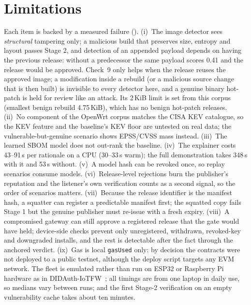 \documentclass[conference]{IEEEtran}
\newcommand{\res}[1]{{\small\path{#1}}}  %
\begin{document}
\section{Limitations}
\label{sec:limits}
Each item is backed by a measured failure (\res{docs/limitations.md}).
(i)~The image detector sees \emph{structural} tampering only; a malicious build that preserves
size, entropy and layout passes Stage 2, and detection of an appended payload depends on having
the previous release: without a predecessor the same payload scores 0.41 and the release would be
approved. Check~9 only helps when the release reuses the approved image; a modification inside a
rebuild (or a malicious source change that is then built) is invisible to every detector here,
and a genuine binary hot-patch is held for review like an attack. Its 2\,KiB limit is set from
this corpus (smallest benign rebuild 4.75\,KiB), which has no benign hot-patch releases. (ii)~No component of the OpenWrt corpus matches the CISA KEV catalogue, so the KEV
feature and the baseline's KEV floor are untested on real data; the vulnerable-but-genuine
scenario shows EPSS/CVSS mass instead. (iii)~The learned SBOM model does not out-rank the
baseline. (iv)~The explainer costs 43--91\,s per rationale on a CPU (30--33\,s warm); the full
demonstration takes 348\,s with it and 53\,s without. (v)~A model hash can be revoked once, so replay scenarios
consume models. (vi)~Release-level rejections burn the publisher's reputation and the listener's
own verification counts as a second signal, so the order of scenarios matters. (vii)~Because the
release identifier is the manifest hash, a squatter can register a predictable manifest first;
the squatted copy fails Stage 1 but the genuine publisher must re-issue with a fresh expiry.
(viii)~A compromised gateway can still approve a registered release that the gate would have
held; device-side checks prevent only unregistered, withdrawn, revoked-key and downgraded
installs, and the rest is detectable after the fact through the anchored verdict.
(ix)~Gas is local \texttt{gasUsed} only: by decision the contracts were not deployed to a public
testnet, although the deploy script targets any EVM network. The fleet is emulated rather than
run on ESP32 or Raspberry Pi hardware as in DIDAuth-IoTFW~\cite{didauth}; all timings are from
one laptop in daily use, so medians vary between runs; and the first
Stage-2 verification on an empty vulnerability cache takes about ten minutes.
\end{document}
